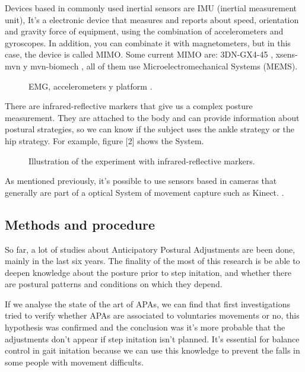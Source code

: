 Devices based in commonly used inertial sensors are IMU (inertial measurement unit), It’s a electronic device that measures and reports about speed, orientation and gravity force of equipment, using the combination of accelerometers and gyroscopes.
In addition, you can combinate it with magnetometers, but in this case, the device is called MIMO. Some current MIMO are: 3DN-GX4-45 \cite{Instr2},  xsens-mvn \cite{Instr3} y mvn-biomech \cite{Instr4}, all of them use Microelectromechanical Systems (MEMS).

\begin{figure}[H]
	\centering
	\caption{EMG, accelerometers y platform \cite{Gay2011}.}
	\label{fig:Captura}
\end{figure}

There are  infrared-reflective markers that give us a complex posture measurement. They are attached  to the body and can provide information about postural strategies, so we can know if the subject uses the ankle strategy or the hip strategy. For example, figure [2] shows the System.

\begin{figure}[H]
	\centering
	\caption{Illustration of the experiment with infrared-reflective markers\cite{Teddy2013}.}
	\label{fig:Captura2}
\end{figure}

As mentioned previously, it's possible to use sensors based in cameras that generally are part of a optical System of movement capture such  as Kinect. \cite{Instr5}.


\subsection{Methods and procedure}

So far, a lot of studies about Anticipatory Postural Adjustments are been done, mainly in the  last six years. The finality of the most of this research is be able to deepen knowledge about the posture prior to step initation, and whether there are postural patterns and conditions on which they depend.

If we analyse the state of the art of APAs, we can find that first investigations tried to verify whether APAs are associated to voluntaries movements or no,  this hypothesis was confirmed and the conclusion was it’s more probable that the adjustments don’t appear if step initation isn’t planned. It’s essential for balance control in gait initation because we can use this knowledge to prevent the falls in some people with movement difficults.\cite{Mcllroy1993}\cite{Yiou2012}\cite{Teddy2013}\cite{Bouisset2008}\cite{Neeta2014}

